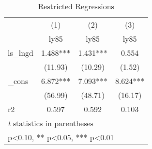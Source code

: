 \begin{table}[htbp]\centering
\def\sym#1{\ifmmode^{#1}\else\(^{#1}\)\fi}
\caption{Restricted Regressions}
\begin{tabular}{l*{3}{c}}
\hline\hline
            &\multicolumn{1}{c}{(1)}&\multicolumn{1}{c}{(2)}&\multicolumn{1}{c}{(3)}\\
            &\multicolumn{1}{c}{ly85}&\multicolumn{1}{c}{ly85}&\multicolumn{1}{c}{ly85}\\
\hline
ls\_lngd     &       1.488***&       1.431***&       0.554   \\
            &     (11.93)   &     (10.29)   &      (1.52)   \\
[1em]
\_cons      &       6.872***&       7.093***&       8.624***\\
            &     (56.99)   &     (48.71)   &     (16.17)   \\
\hline
r2          &       0.597   &       0.592   &       0.103   \\
\hline\hline
\multicolumn{4}{l}{\footnotesize \textit{t} statistics in parentheses}\\
\multicolumn{4}{l}{\footnotesize * p<0.10, ** p<0.05, *** p<0.01}\\
\end{tabular}
\end{table}
